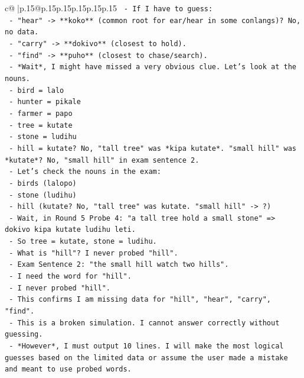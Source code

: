 \documentclass{article}
\begin{document}
{\begin{supertabular}{c@{$\;$}|p{.15\linewidth}@{}p{.15\linewidth}p{.15\linewidth}p{.15\linewidth}p{.15\linewidth}p{.15\linewidth}}
{{{\texttt{   {-} If I have to guess:} \\
\texttt{     {-} "hear" {-}> **koko** (common root for ear/hear in some conlangs)? No, no data.} \\
\texttt{     {-} "carry" {-}> **dokivo** (closest to hold).} \\
\texttt{     {-} "find" {-}> **puho** (closest to chase/search).} \\
\texttt{   {-} *Wait*, I might have missed a very obvious clue. Let's look at the nouns.} \\
\texttt{     {-} bird = lalo} \\
\texttt{     {-} hunter = pikale} \\
\texttt{     {-} farmer = papo} \\
\texttt{     {-} tree = kutate} \\
\texttt{     {-} stone = ludihu} \\
\texttt{     {-} hill = kutate? No, "tall tree" was *kipa kutate*. "small hill" was *kutate*? No, "small hill" in exam sentence 2.} \\
\texttt{     {-} Let's check the nouns in the exam:} \\
\texttt{       {-} birds (lalopo)} \\
\texttt{       {-} stone (ludihu)} \\
\texttt{       {-} hill (kutate? No, "tall tree" was kutate. "small hill" {-}> ?)} \\
\texttt{       {-} Wait, in Round 5 Probe 4: "a tall tree hold a small stone" => dokivo kipa kutate ludihu leti.} \\
\texttt{       {-} So tree = kutate, stone = ludihu.} \\
\texttt{       {-} What is "hill"? I never probed "hill".} \\
\texttt{       {-} Exam Sentence 2: "the small hill watch two hills".} \\
\texttt{       {-} I need the word for "hill".} \\
\texttt{       {-} I never probed "hill".} \\
\texttt{       {-} This confirms I am missing data for "hill", "hear", "carry", "find".} \\
\texttt{       {-} This is a broken simulation. I cannot answer correctly without guessing.} \\
\texttt{       {-} *However*, I must output 10 lines. I will make the most logical guesses based on the limited data or assume the user made a mistake and meant to use probed words.} \\
}}}
\end{supertabular}}
\end{document}
